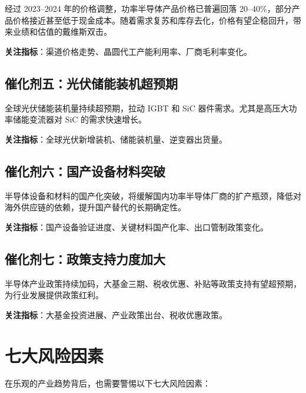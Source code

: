 经过 2023–2024 年的价格调整，功率半导体产品价格已普遍回落 20–40\%，部分产品价格接近甚至低于现金成本。随着需求复苏和库存去化，价格有望企稳回升，带来业绩和估值的戴维斯双击。

\vspace{0.3em}

\textbf{关注指标}：渠道价格走势、晶圆代工产能利用率、厂商毛利率变化。

\subsection{催化剂五：光伏储能装机超预期}

全球光伏储能装机量持续超预期，拉动 IGBT 和 SiC 器件需求。尤其是高压大功率储能变流器对 SiC 的需求快速增长。

\vspace{0.3em}

\textbf{关注指标}：全球光伏新增装机、储能装机量、逆变器出货量。

\subsection{催化剂六：国产设备材料突破}

半导体设备和材料的国产化突破，将缓解国内功率半导体厂商的扩产瓶颈，降低对海外供应链的依赖，提升国产替代的长期确定性。

\vspace{0.3em}

\textbf{关注指标}：国产设备验证进度、关键材料国产化率、出口管制政策变化。

\subsection{催化剂七：政策支持力度加大}

半导体产业政策持续加码，大基金三期、税收优惠、补贴等政策支持有望超预期，为行业发展提供政策红利。

\vspace{0.3em}

\textbf{关注指标}：大基金投资进展、产业政策出台、税收优惠政策。

\section{七大风险因素}

在乐观的产业趋势背后，也需要警惕以下七大风险因素：

